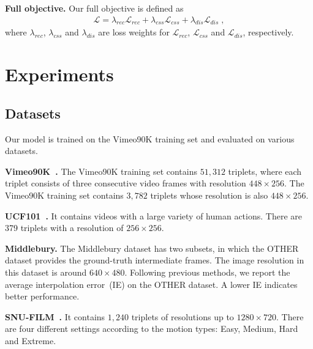 \documentclass[10pt,twocolumn,letterpaper]{article}
\begin{document}
\vspace{0.05in}	
	\noindent\textbf{Full objective.} Our full objective is defined as
	\begin{align}
	\mathcal{L} = {\lambda}_{rec}\mathcal{L}_{rec} + {\lambda}_{css}\mathcal{L}_{css} + {\lambda}_{dis}\mathcal{L}_{dis} \;,
	\end{align}
	where ${\lambda}_{rec}$, ${\lambda}_{css}$ and ${\lambda}_{dis}$ are loss weights for $\mathcal{L}_{rec}$, $\mathcal{L}_{css}$ and $\mathcal{L}_{dis}$, respectively.
	
\section{Experiments}
	
	\subsection{Datasets}
	
	Our model is trained on the Vimeo90K training set and evaluated on various datasets.

	\vspace{0.05in}	
	\noindent\textbf{Vimeo90K~\cite{vimeo90k}.} The Vimeo90K training set contains $51,312$ triplets, where each triplet consists of three consecutive video frames with resolution $448\times 256$. The Vimeo90K training set contains $3,782$ triplets whose resolution is also $448\times 256$.

	\vspace{0.05in}	
	\noindent\textbf{UCF101~\cite{ucf101}.} It contains videos with a large variety of human actions. There are 379 triplets with a resolution of $256\times 256$.

	\vspace{0.05in}	
	\noindent\textbf{Middlebury.} The Middlebury dataset has two subsets, in which the OTHER dataset provides the ground-truth intermediate frames. The image resolution in this dataset is around $640\times 480$. Following previous methods, we report the average interpolation error~(IE) on the OTHER dataset. A lower IE indicates better performance.
	
	
\vspace{0.05in}	
	\noindent\textbf{SNU-FILM~\cite{snufilm}.} It contains $1,240$ triplets of resolutions up to $1280\times 720$. There are four different settings according to the motion types: Easy, Medium, Hard and Extreme.
	
\end{document}
